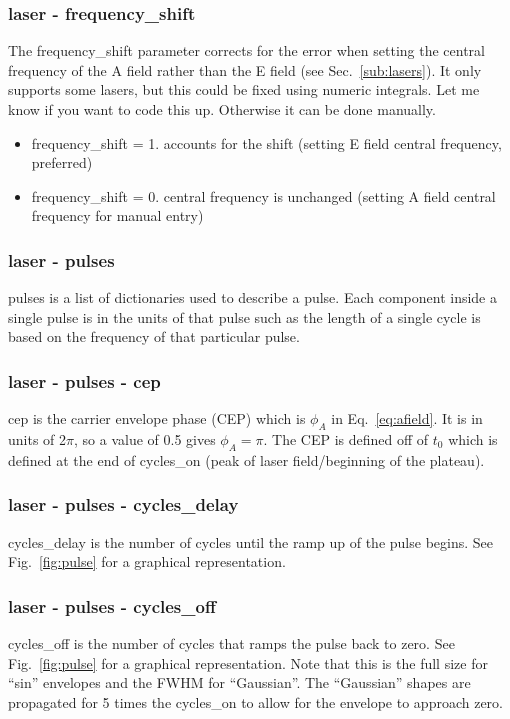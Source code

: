 \documentclass{article}
\begin{document}
\subsubsection{laser - frequency\_shift}
\label{ssub:laser_parameter-frequency_shift}
The frequency\_shift parameter corrects for the error when setting the central frequency of the A field rather than the E field (see Sec.~\ref{sub:lasers}). It only supports some lasers, but this could be fixed using numeric integrals. Let me know if you want to code this up. Otherwise it can be done manually.
\begin{itemize}
  \item frequency\_shift = 1. accounts for the shift (setting E field central frequency, preferred)
  \item frequency\_shift = 0. central frequency is unchanged (setting A field central frequency for manual entry)
\end{itemize}

\subsubsection{laser - pulses}
pulses is a list of dictionaries used to describe a pulse. Each component inside a single pulse is in the units of that pulse such as the length of a single cycle is based on the frequency of that particular pulse.

\subsubsection{laser - pulses - cep}
cep is the carrier envelope phase (CEP) which is $\phi_A$ in Eq.~\ref{eq:afield}. It is in units of 2$\pi$, so a value of 0.5 gives $\phi_A=\pi$. The CEP is defined off of $t_0$ which is defined at the end of cycles\_on (peak of laser field/beginning of the plateau).

\subsubsection{laser - pulses - cycles\_delay}
cycles\_delay is the number of cycles until the ramp up of the pulse begins. See Fig.~\ref{fig:pulse} for a graphical representation.

\subsubsection{laser - pulses - cycles\_off}
cycles\_off is the number of cycles that ramps the pulse back to zero. See Fig.~\ref{fig:pulse} for a graphical representation. Note that this is the full size for ``sin'' envelopes and the FWHM for ``Gaussian''. The ``Gaussian'' shapes are propagated for 5 times the cycles\_on to allow for the envelope to approach zero.
\end{document}
